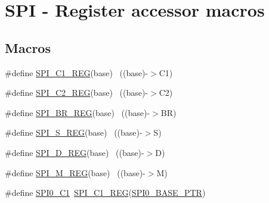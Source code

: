 \hypertarget{group___s_p_i___register___accessor___macros}{}\section{S\+PI -\/ Register accessor macros}
\label{group___s_p_i___register___accessor___macros}
\subsection*{Macros}
\begin{DoxyCompactItemize}
\item 
\#define \hyperlink{group___s_p_i___register___accessor___macros_ga15cf0a6fa68781816e64f5bf3bd38d2a}{S\+P\+I\+\_\+\+C1\+\_\+\+R\+EG}(base)                                              ~((base)-\/$>$C1)
\item 
\#define \hyperlink{group___s_p_i___register___accessor___macros_ga82cc2ad7cb1e2b9737462735d8ed95aa}{S\+P\+I\+\_\+\+C2\+\_\+\+R\+EG}(base)                                              ~((base)-\/$>$C2)
\item 
\#define \hyperlink{group___s_p_i___register___accessor___macros_gac5dff3cf0898bfd7d2230d49cb3951a9}{S\+P\+I\+\_\+\+B\+R\+\_\+\+R\+EG}(base)                                              ~((base)-\/$>$BR)
\item 
\#define \hyperlink{group___s_p_i___register___accessor___macros_ga88ebe8b9c7afe3c8d2aa0d9de8d860e2}{S\+P\+I\+\_\+\+S\+\_\+\+R\+EG}(base)                                                ~((base)-\/$>$S)
\item 
\#define \hyperlink{group___s_p_i___register___accessor___macros_ga44444744f147821a03664f89cdf93c0c}{S\+P\+I\+\_\+\+D\+\_\+\+R\+EG}(base)                                                ~((base)-\/$>$D)
\item 
\#define \hyperlink{group___s_p_i___register___accessor___macros_gaf2776d85ed3269dd24085747bb361d0a}{S\+P\+I\+\_\+\+M\+\_\+\+R\+EG}(base)                                                ~((base)-\/$>$M)
\item 
\#define \hyperlink{group___s_p_i___register___accessor___macros_ga2b777381f1ec71e064b9de35c6dd8dd1}{S\+P\+I0\+\_\+\+C1}~\hyperlink{group___s_p_i___register___accessor___macros_ga15cf0a6fa68781816e64f5bf3bd38d2a}{S\+P\+I\+\_\+\+C1\+\_\+\+R\+EG}(\hyperlink{group___s_p_i___peripheral_ga851f64a97b5919c1f99a34db5918b3b4}{S\+P\+I0\+\_\+\+B\+A\+S\+E\+\_\+\+P\+TR})
\item 

\end{DoxyCompactItemize}
